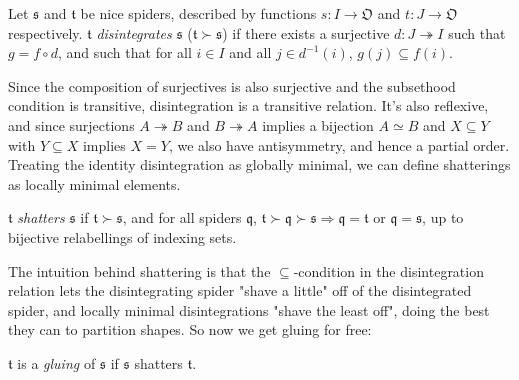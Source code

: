 \begin{defn}[Disintegration]
Let $\mathfrak{s}$ and $\mathfrak{t}$ be nice spiders, described by functions $s: I \rightarrow \mathfrak{O}$ and $t: J \rightarrow \mathfrak{O}$ respectively. $\mathfrak{t}$ \emph{disintegrates} $\mathfrak{s}$ ($\mathfrak{t} \succ \mathfrak{s}$) if there exists a surjective $d: J \twoheadrightarrow I$ such that $g = f \circ d$, and such that for all $i \in I$ and all $j \in d^{-1}(i)$, $g(j) \subseteq f(i)$.
\end{defn}

Since the composition of surjectives is also surjective and the subsethood condition is transitive, disintegration is a transitive relation. It's also reflexive, and since surjections $A \twoheadrightarrow B$ and $B \twoheadrightarrow A$ implies a bijection $A \simeq B$ and $X \subseteq Y$ with $Y \subseteq X$ implies $X = Y$, we also have antisymmetry, and hence a partial order. Treating the identity disintegration as globally minimal, we can define shatterings as locally minimal elements.

\begin{defn}
$\mathfrak{t}$ \emph{shatters} $\mathfrak{s}$ if $\mathfrak{t} \succ \mathfrak{s}$, and for all spiders $\mathfrak{q}$, $\mathfrak{t} \succ \mathfrak{q} \succ \mathfrak{s} \Rightarrow \mathfrak{q} = \mathfrak{t}$ or $\mathfrak{q} = \mathfrak{s}$, up to bijective relabellings of indexing sets.
\end{defn}

The intuition behind shattering is that the $\subseteq$-condition in the disintegration relation lets the disintegrating spider "shave a little" off of the disintegrated spider, and locally minimal disintegrations "shave the least off", doing the best they can to partition shapes. So now we get gluing for free:

\begin{defn}
$\mathfrak{t}$ is a \emph{gluing} of $\mathfrak{s}$ if $\mathfrak{s}$ shatters $\mathfrak{t}$.
\end{defn}